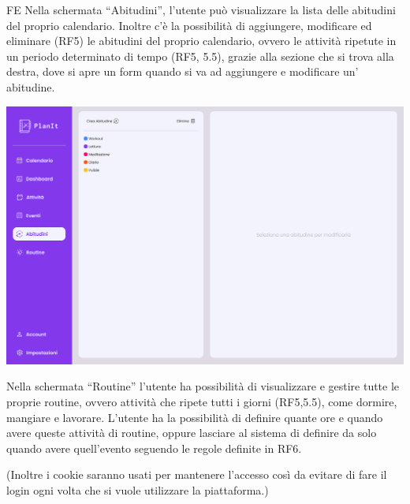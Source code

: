 \begin{listaPersonale}{FE}
     Nella schermata “Abitudini”, l’utente può visualizzare la lista delle abitudini del proprio calendario. Inoltre c’è la possibilità di aggiungere, modificare ed eliminare (RF5) le abitudini del proprio calendario, ovvero le attività ripetute in un periodo determinato di tempo (RF5, 5.5), grazie alla sezione che si trova alla destra, dove si apre un form quando si va ad aggiungere e modificare un’ abitudine.
    \begin{center}
        \includegraphics[width=1\textwidth]{img/FrontEnd/Abitudini/Abitudini.png}
    \end{center}

     Nella schermata “Routine” l’utente ha possibilità di visualizzare e gestire tutte le proprie routine, ovvero attività che ripete tutti i giorni (RF5,5.5), come dormire, mangiare e lavorare. L’utente ha la possibilità di definire quante ore e quando avere queste attività di routine, oppure lasciare al sistema di definire da solo quando avere quell’evento seguendo le regole definite in RF6.
    

    


\end{listaPersonale}


(Inoltre i cookie saranno usati per mantenere l'accesso così da evitare di fare il login ogni volta che si vuole utilizzare la piattaforma.)